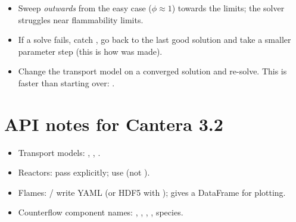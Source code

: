 \begin{itemize}
  \item Sweep \emph{outwards} from the easy case ($\phi\approx1$) towards the limits; the solver
        struggles near flammability limits.
  \item If a solve fails, catch , go back to the last good solution and take a
        smaller parameter step (this is how  was made).
  \item Change the transport model on a converged solution and re-solve. This is faster than starting
        over: .
\end{itemize}

\section{API notes for Cantera 3.2}
\begin{itemize}
  \item Transport models: , , .
  \item Reactors: pass  explicitly; use  (not ).
  \item Flames: / write YAML (or HDF5 with );
         gives a DataFrame for plotting.
  \item Counterflow component names: , , , , species.
\end{itemize}

